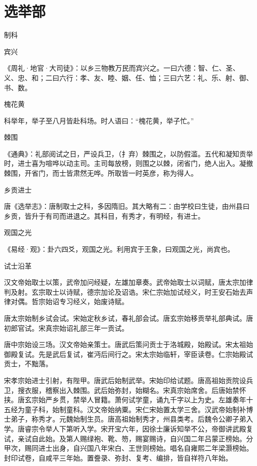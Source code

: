 \documentclass[a4paper,12pt,UTF8,twoside]{ctexbook}
\begin{document}
    \part{选举部}
    制科
    
    宾兴
    
    《周礼·地官·大司徒》：以乡三物教万民而宾兴之。一曰六德：智、仁、圣、义、忠、和；二曰六行：孝、友、睦、姻、任、恤；三曰六艺：礼、乐、射、御、书、数。
    
    槐花黄
    
    科举年，举子至八月皆赴科场。时人语曰：“槐花黄，举子忙。”
    
    棘围
    
    《通典》：礼部阅试之日，严设兵卫，（扌弃）棘围之，以防假滥。五代和凝知贡举时，进士喜为喧哗以动主司。主司每放榜，则围之以棘，闭省门，绝人出入。凝撤棘围，开省门，而士皆肃然无哗。所取皆一时英彦，称为得人。
    
    乡贡进士
    
    唐《选举志》：唐制取士之科，多因隋旧。其大略有二：由学校曰生徒，由州县曰乡贡，皆升于有司而进退之。其科目，有秀才，有明经，有进士。
    
    观国之光
    
    《易经·观》：卦六四爻，观国之光。利用宾于王象，曰观国之光，尚宾也。
    
    试士沿革
    
    汉文帝始取士以策，武帝加问经疑，左雄加章奏。武帝始取士以词赋，唐太宗加律判及射。玄宗取士以诗赋，德宗加论及诏诰。宋仁宗始加试经义，时王安石始去声律对偶。哲宗始诏专习经义，始废诗赋。
    
    唐太宗始制乡试会试。宋始定秋乡试，春礼部会试。唐玄宗始移贡举礼部典试。唐初郎官试。宋真宗始诏礼部三年一贡试。
    
    唐中宗始设三场。汉文帝始亲策士。唐武后策问贡士于洛城殿，始殿试。宋太祖始御殿复试。先是武后复试，崔沔后间行之。宋太宗始临轩，宰臣读卷。仁宗始殿试贡士，不黜落。
    
    宋孝宗始进士引射，有陛甲。唐武后始制武举。宋始印给试题。唐高祖始贡院设兵卫，搜衣服，稽察出入棘围。武后始弥封，始糊名。宋真宗始席舍。后唐始禁怀挟。唐玄宗始严乡贯，禁举人冒籍。萧何试学童，诵九千字以上为史。左雄奏年十五经为童子科，始制童科。汉文帝始纳粟。宋仁宋始置太学三舍。汉武帝始制补博士弟子，称秀才。元魏始制生员。唐高祖始制秀才，州县类考。后魏令公卿子弟入学。唐睿宗令举人下第听入学。宋开宝六年，因徐士廉诉知举不公，帝御讲武殿复试，亲试自此始。及第人赐绿袍、靴、笏，赐宴赐诗，自兴国二年吕蒙正榜始。分甲次，赐同进士出身，自兴国八年宋白、王世则榜始。唱名自雍熙二年梁灏榜始。封印试卷，自咸平三年始。置誊录、弥封、复考、编排，皆自祥符八年始。
    
\end{document}

